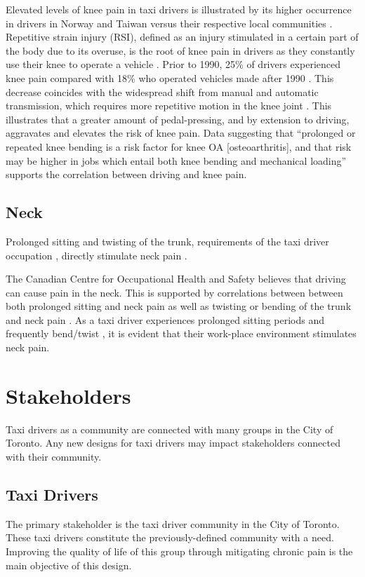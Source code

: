 \documentclass[11pt]{article}
\begin{document}
Elevated levels of knee pain in taxi drivers is illustrated by its higher occurrence in drivers 
in Norway and Taiwan versus their respective local communities \cite{KneePain}. Repetitive strain 
injury (RSI), defined as an injury stimulated in a certain part of the body due to its overuse, is the 
root of knee pain in drivers \cite{RSI} as they constantly use their knee to operate a vehicle 
\cite{KneePain}. Prior to 1990, 25\% of drivers experienced knee pain compared with 18\% who 
operated vehicles made after 1990 \cite{KneePain}. This decrease coincides with the widespread shift from 
manual and automatic transmission, which requires more repetitive motion in the knee joint 
\cite{KneePain}. This illustrates that a greater amount of pedal-pressing, and by extension to 
driving, aggravates and elevates the risk of knee pain. Data suggesting that “prolonged or repeated 
knee bending is a risk factor for knee OA [osteoarthritis], and that risk may be higher in jobs which 
entail both knee bending and mechanical loading” \cite{Osteoarthritis} supports the correlation 
between driving and knee pain.



\subsection{Neck}
Prolonged sitting and twisting of the trunk, requirements of the taxi driver occupation \cite{neck}, 
directly stimulate neck pain \cite{neck}. 

The Canadian Centre for Occupational Health and Safety believes that driving can cause pain in the 
neck\cite{proof}. This is supported by correlations between between both prolonged sitting and neck pain as well as  
twisting or bending of the trunk and neck pain \cite{neck}. 
As a taxi driver experiences prolonged sitting periods and frequently bend/twist \cite{Okunribido2008, POSTULATED},
it is evident that their work-place environment stimulates neck pain. 
\section{Stakeholders}
\label{sec:stake}
Taxi drivers as a community are connected with many groups in the City
of Toronto. Any new designs for taxi drivers may impact
stakeholders connected with their community.
 
\subsection{Taxi Drivers}
The primary stakeholder is the taxi driver community in the City of
Toronto. These taxi drivers constitute the previously-defined community with a
need. Improving the quality of life of this group through mitigating
chronic pain is the main objective of this design.
 
\end{document}

